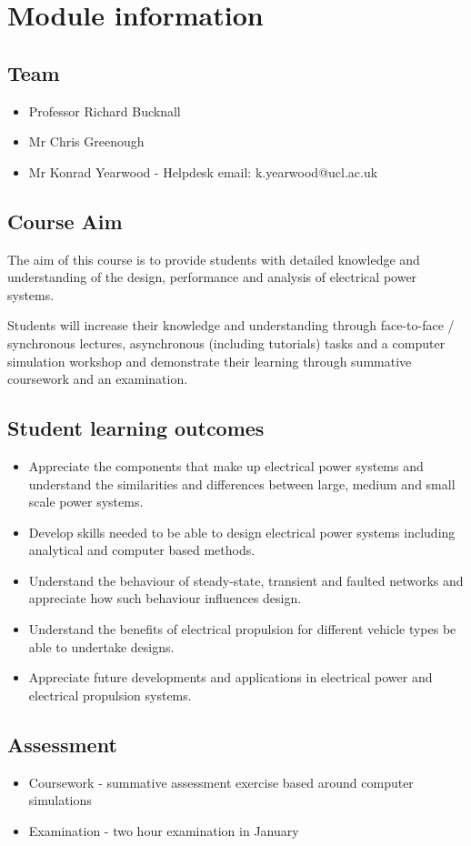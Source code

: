 \section*{Module information}
\subsection*{Team}
\begin{itemize}
    \item Professor Richard Bucknall
    \item Mr Chris Greenough
    \item Mr Konrad Yearwood - Helpdesk email: k.yearwood@ucl.ac.uk
\end{itemize}
\subsection*{Course Aim}
The aim of this course is to provide students with detailed knowledge and understanding of the design, performance and analysis of electrical power systems.

Students will increase their knowledge and understanding through face-to-face / synchronous lectures, asynchronous (including tutorials) tasks and a computer simulation workshop and demonstrate their learning through summative coursework and an examination.
\subsection*{Student learning outcomes}
\begin{itemize}
    \item Appreciate the components that make up electrical power systems and understand the similarities and differences between large, medium and small scale power systems.
    \item Develop skills needed to be able to design electrical power systems including analytical and computer based methods.
    \item Understand the behaviour of steady-state, transient and faulted networks and appreciate how such behaviour influences design.
    \item Understand the benefits of electrical propulsion for different vehicle types be able to undertake designs.
    \item Appreciate future developments and applications in electrical power and electrical propulsion systems.
\end{itemize}
\subsection*{Assessment}
\begin{itemize}
    \item Coursework - summative assessment exercise based around computer simulations
    \item Examination - two hour examination in January
\end{itemize}

